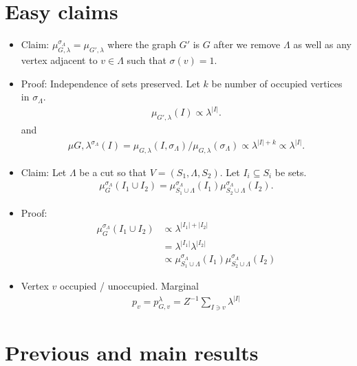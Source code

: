 \documentclass[11pt]{article} \usepackage{amssymb}
\newcommand{\act}{\lambda}
\begin{document}
\section{Easy claims}
\begin{itemize}
\item Claim: $\mu_{G,\act}^{\sigma_\Lambda}=\mu_{G',\act}$ where the
  graph $G'$ is $G$ after we remove $\Lambda$ as well as any vertex adjacent to
  $v \in \Lambda$ such that $\sigma(v)=1$.
\item Proof: Independence of sets preserved. Let $k$ be number of
  occupied vertices in $\sigma_\Lambda$.
  \begin{align*}
    \mu_{G',\act}(I) \propto \lambda^{|I|}.
  \end{align*}
  and
  \begin{align*}
    \mu{G,\act}^{\sigma_\Lambda}(I) =
    \mu_{G,\act}(I,\sigma_\Lambda)/\mu_{G,\act}(\sigma_\Lambda)
    \propto \act^{|I|+k} \propto \act^{|I|}.
  \end{align*}
\item Claim: Let $\Lambda$ be a cut so that $V=(S_1,\Lambda,S_2)$. Let
  $I_i \subseteq S_i$ be sets.
  \begin{align*}
   \mu_G^{\sigma_\Lambda}(I_1 \cup I_2)=\mu_{S_1\cup \Lambda}^{\sigma_\Lambda}(I_1)\mu_{S_2
   \cup \Lambda}^{\sigma_\Lambda}(I_2). 
  \end{align*}
\item Proof:
  \begin{align*}
   \mu_G^{\sigma_\Lambda}(I_1 \cup I_2) &\propto \act^{|I_1|+|I_2|}\\
   &= \act^{|I_1|}\act^{|I_2|}\\
   &\propto \mu_{S_1\cup \Lambda}^{\sigma_\Lambda}(I_1)\mu_{S_2
   \cup \Lambda}^{\sigma_\Lambda}(I_2)
 \end{align*}
\item Vertex $v$ occupied / unoccupied. Marginal
  \begin{align*}
    p_v=p_{G,v}^\act = Z^{-1}\sum_{I \ni v}\act^{|I|}
  \end{align*}
\end{itemize}

\section{Previous and main results}
\end{document}

